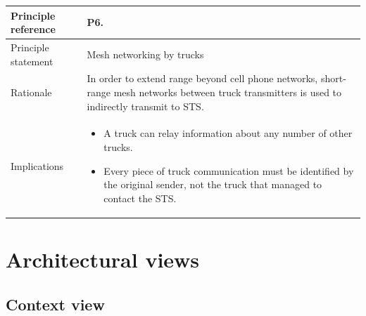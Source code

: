 \documentclass[a4paper,11pt]{report}
\begin{document}
\begin{center}
\begin{tabular}[h!]{| >{\columncolor{gray}}p{} | p{} |}
  \hline
  Principle reference & P6. \\
  \hline
  Principle statement & Mesh networking by trucks \\
  \hline
  Rationale & In order to extend range beyond cell phone networks, short-range mesh networks between truck transmitters is used to indirectly transmit to STS. \\
  \hline
  Implications & \begin{itemize}
  \item A truck can relay information about any number of other trucks.
  \item Every piece of truck communication must be identified by the
    original sender, not the truck that managed to contact the STS.
    \end{itemize}
        \\
    \hline
  \end{tabular}

\end{center}

\chapter{Architectural views}
\label{cha:architectural-views}
\thispagestyle{fancy}

\section{Context view}
\label{sec:context-view}

\end{document}
